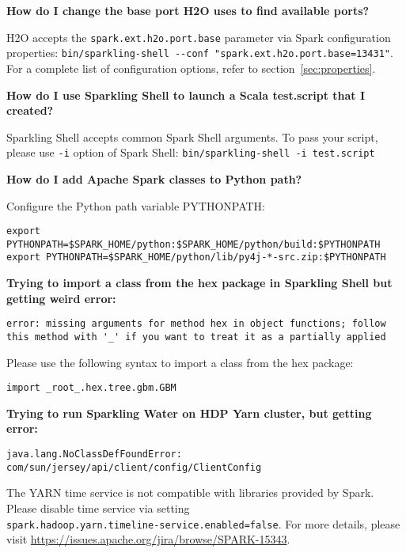 \textbf{How do I change the base port H2O uses to find available ports?}

H2O accepts the \texttt{spark.ext.h2o.port.base} parameter via Spark configuration
properties: {\lstinline[style=Bash]|bin/sparkling-shell --conf "spark.ext.h2o.port.base=13431"|}. For a complete list
of configuration options, refer to section~\ref{sec:properties}.

\textbf{How do I use Sparkling Shell to launch a Scala test.script that I created?}

Sparkling Shell accepts common Spark Shell arguments. To pass your script, please
use \texttt{-i} option of Spark Shell: {\lstinline[style=Bash]|bin/sparkling-shell -i test.script|}

\textbf{How do I add Apache Spark classes to Python path?}

Configure the Python path variable PYTHONPATH:
        
\begin{lstlisting}[style=Bash]
export PYTHONPATH=$SPARK_HOME/python:$SPARK_HOME/python/build:$PYTHONPATH
export PYTHONPATH=$SPARK_HOME/python/lib/py4j-*-src.zip:$PYTHONPATH
\end{lstlisting}

\textbf{Trying to import a class from the hex package in Sparkling Shell but getting weird error:}

\begin{lstlisting}[style=Scala]
error: missing arguments for method hex in object functions; follow this method with '_' if you want to treat it as a partially applied
\end{lstlisting}

Please use the following syntax to import a class from the hex package:
\begin{lstlisting}[style=Scala]
import _root_.hex.tree.gbm.GBM
\end{lstlisting}


\textbf{Trying to run Sparkling Water on HDP Yarn cluster, but getting error:}

\begin{lstlisting}[style=Scala]
java.lang.NoClassDefFoundError: com/sun/jersey/api/client/config/ClientConfig
\end{lstlisting}

The YARN time service is not compatible with libraries provided by Spark. Please disable time service via setting \\
\texttt{spark.hadoop.yarn.timeline-service.enabled=false}.
For more details, please visit \url{https://issues.apache.org/jira/browse/SPARK-15343}.

